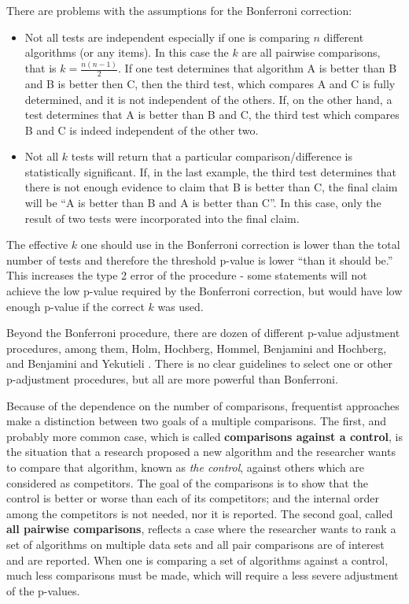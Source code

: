 \documentclass[twoside,11pt,preprint]{article}
\begin{document}
There are problems with the assumptions for the Bonferroni correction:

\begin{itemize}
\item
  Not all tests are independent especially if one is comparing \(n\)
  different algorithms (or any items). In this case the \(k\) are all
  pairwise comparisons, that is \(k = \frac{n(n-1)}{2}\). If one test
  determines that algorithm A is better than B and B is better then
  C, then the third test, which compares A and C is fully
  determined, and it is not independent of the others. If, on the
  other hand, a test determines that A is better than B and C, the
  third test which compares B and C is indeed independent of the
  other two.
\item
  Not all \(k\) tests will return that a particular
  comparison/difference is statistically significant. If, in the
  last example, the third test determines that there is not enough
  evidence to claim that B is better than C, the final claim will be
  ``A is better than B and A is better than C''. In this case, only
  the result of two tests were incorporated into the final claim.
\end{itemize}

The effective \(k\) one should use in the Bonferroni correction is lower
than the total number of tests and therefore the threshold p-value is
lower ``than it should be.'' This increases the type 2 error of the
procedure - some statements will not achieve the low p-value required
by the Bonferroni correction, but would have low enough p-value if the
correct \(k\) was used.

Beyond the Bonferroni procedure, there are dozen of different p-value
adjustment procedures, among them, Holm, Hochberg, Hommel, Benjamini and
Hochberg, and Benjamini and Yekutieli \citep{padj}. There is no clear
guidelines to select one or other p-adjustment procedures, but all are
more powerful than Bonferroni.

Because of the dependence on the number of comparisons, frequentist
approaches make a distinction between two goals of a
multiple comparisons. The first, and probably more common case, which
is called \textbf{comparisons against a control}, is the situation that
a research proposed a new algorithm and the researcher wants to
compare that algorithm, known as \emph{the control}, against others which are
considered as competitors. The goal of the comparisons is to show
that the control is better or worse than each of its competitors; and
the internal order among the competitors is not needed, nor it is
reported. The second goal, called \textbf{all pairwise
comparisons}, reflects a case where the researcher wants to rank a
set of algorithms on multiple data sets and all pair comparisons
are of interest and are reported. When one is comparing a set of
algorithms against a control, much less comparisons must be made,
which will require a less severe adjustment of the p-values.
\end{document}
